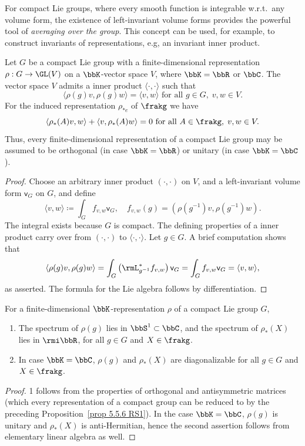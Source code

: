 For compact Lie groups, where every smooth function is integrable w.r.t.\ any volume form, the existence of left-invariant volume forms provides the powerful tool of \emph{averaging over the group}. This concept can be used, for example, to construct invariants of representations, e.g, an invariant inner product.

\begin{prop}\label{prop 5.5.6 RS1}
    Let $G$ be a compact Lie group with a finite-dimensional representation $\rho:G\to \GL(V)$ on a $\bbK$-vector space $V$, where $\bbK=\bbR$ or $\bbC$. The vector space $V$ admits a inner product $\langle\cdot,\cdot\rangle$ such that
    \[\langle\rho(g)v,\rho(g)w\rangle=\langle v,w\rangle\text{ for all }g\in G,\; v,w\in V.\]
    For the induced representation $\rho_{\ast e}$ of $\frakg$ we have
    \[\langle \rho_{\ast}(A)v,w\rangle+\langle v,\rho_\ast (A) w\rangle=0\text{ for all }A\in\frakg,\;v,w\in V.\]
    Thus, every finite-dimensional representation of a compact Lie group may be assumed to be orthogonal (in case $\bbK=\bbR$) or unitary (in case $\bbK=\bbC$).
\end{prop}
\begin{proof}
    Choose an arbitrary inner product $(\cdot,\cdot)$ on $V$, and a left-invariant volume form $\mathsf{v}_G$ on $G$, and define
    \[ \langle v,w\rangle \coloneqq\int_G f_{v,w}\mathsf{v}_G, \quad f_{v,w}(g)=\left(\rho(g^{-1})v,\rho(g^{-1})w\right).\]
    The integral exists because $G$ is compact. The defining properties of a inner product carry over from $(\cdot,\cdot)$ to $\langle\cdot,\cdot\rangle$. Let $g\in G$. A brief computation shows that 
    \[\langle\rho(g)v,\rho(g)w\rangle=\int_G \left(\rmL_{g^{-1}}^\ast f_{v,w}\right)\mathsf{v}_G =\int_G f_{v,w}\mathsf{v}_G=\langle v,w\rangle,\]
    as asserted. The formula for the Lie algebra follows by differentiation.
\end{proof}


\begin{cor}[{{\cite[Cor.~5.5.7]{RS1}}}]\label{cor 5.5.7 RS1}
    For a finite-dimensional $\bbK$-representation $\rho$ of a compact Lie group $G$,
    \begin{enumerate}
        \item The spectrum of $\rho(g)$ lies in $\bbS^1\subset \bbC$, and the spectrum of $\rho_\ast(X)$ lies in $\rmi \bbR$, for all $g\in G$ and $X\in\frakg$.
        \item In case $\bbK=\bbC$, $\rho(g)$ and $\rho_\ast(X)$ are diagonalizable for all $g\in G$ and $X\in \frakg$.
    \end{enumerate}
\end{cor}
\begin{proof}
    1 follows from the properties of orthogonal and antisymmetric matrices (which every representation of a compact group can be reduced to by the preceding Proposition~\ref{prop 5.5.6 RS1}). In the case $\bbK=\bbC$, $\rho(g)$ is unitary and $\rho_\ast(X)$ is anti-Hermitian, hence the second assertion follows from elementary linear algebra as well.
\end{proof}






